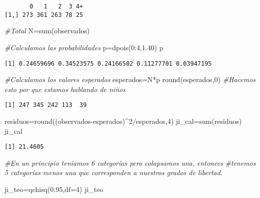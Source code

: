 \documentclass[
  a4paper,
  oneside,
  openany]{book}
\newenvironment{Shaded}{\begin{snugshade}}{\end{snugshade}}
\newcommand{\AttributeTok}[1]{\textcolor[rgb]{0.77,0.63,0.00}{#1}}
\newcommand{\CommentTok}[1]{\textcolor[rgb]{0.56,0.35,0.01}{\textit{#1}}}
\newcommand{\DecValTok}[1]{\textcolor[rgb]{0.00,0.00,0.81}{#1}}
\newcommand{\FloatTok}[1]{\textcolor[rgb]{0.00,0.00,0.81}{#1}}
\newcommand{\FunctionTok}[1]{\textcolor[rgb]{0.00,0.00,0.00}{#1}}
\newcommand{\NormalTok}[1]{#1}
\newcommand{\OtherTok}[1]{\textcolor[rgb]{0.56,0.35,0.01}{#1}}
\newcommand{\SpecialCharTok}[1]{\textcolor[rgb]{0.00,0.00,0.00}{#1}}
\begin{document}
\begin{verbatim}
       0   1   2  3 4+
[1,] 273 361 263 78 25
\end{verbatim}

\begin{Shaded}
\begin{Highlighting}[]
\CommentTok{\#Total}
\NormalTok{N}\OtherTok{=}\FunctionTok{sum}\NormalTok{(observados)}

\CommentTok{\#Calculamos las probabilidades}
\NormalTok{p}\OtherTok{=}\FunctionTok{dpois}\NormalTok{(}\DecValTok{0}\SpecialCharTok{:}\DecValTok{4}\NormalTok{,}\FloatTok{1.40}\NormalTok{)}
\NormalTok{p}
\end{Highlighting}
\end{Shaded}

\begin{verbatim}
[1] 0.24659696 0.34523575 0.24166502 0.11277701 0.03947195
\end{verbatim}

\begin{Shaded}
\begin{Highlighting}[]
\CommentTok{\#Calculamos los valores esperados}
\NormalTok{esperados}\OtherTok{=}\NormalTok{N}\SpecialCharTok{*}\NormalTok{p}
\FunctionTok{round}\NormalTok{(esperados,}\DecValTok{0}\NormalTok{) }\CommentTok{\#Hacemos esto por que estamos hablando de niños}
\end{Highlighting}
\end{Shaded}

\begin{verbatim}
[1] 247 345 242 113  39
\end{verbatim}

\begin{Shaded}
\begin{Highlighting}[]
\NormalTok{residuos}\OtherTok{=}\FunctionTok{round}\NormalTok{((observados}\SpecialCharTok{{-}}\NormalTok{esperados)}\SpecialCharTok{\^{}}\DecValTok{2}\SpecialCharTok{/}\NormalTok{esperados,}\DecValTok{4}\NormalTok{)}
\NormalTok{ji\_cal}\OtherTok{=}\FunctionTok{sum}\NormalTok{(residuos)}
\NormalTok{ji\_cal}
\end{Highlighting}
\end{Shaded}

\begin{verbatim}
[1] 21.4605
\end{verbatim}

\begin{Shaded}
\begin{Highlighting}[]
\CommentTok{\#En un principio teníamos 6 categorías pero colapsamos una, entonces }
\CommentTok{\#tenemos 5 categorías menos una que corresponden a nuestros grados de libertad.}

\NormalTok{ji\_teo}\OtherTok{=}\FunctionTok{qchisq}\NormalTok{(}\FloatTok{0.95}\NormalTok{,}\AttributeTok{df=}\DecValTok{4}\NormalTok{)}
\NormalTok{ji\_teo}
\end{Highlighting}
\end{Shaded}
\end{document}
